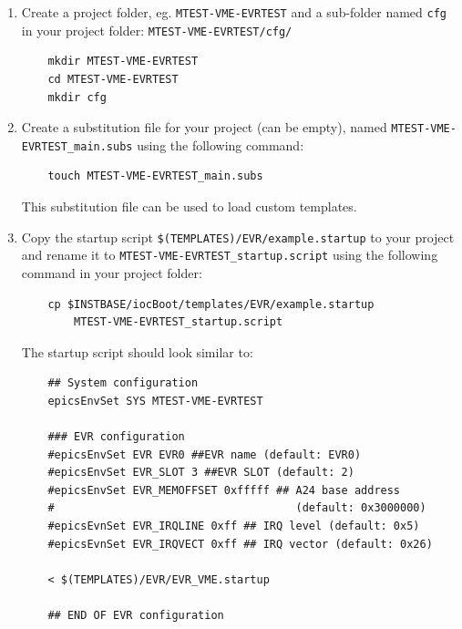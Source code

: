 \documentclass[12pt,a4paper]{article}
\begin{document}
\begin{enumerate}

	\item Create a project folder, eg. \texttt{MTEST-VME-EVRTEST} and a sub-folder named \texttt{cfg} in your project folder: \texttt{MTEST-VME-EVRTEST/cfg/}
\begin{verbatim}
	mkdir MTEST-VME-EVRTEST
	cd MTEST-VME-EVRTEST
	mkdir cfg
\end{verbatim}

	\item Create a substitution file for your project (can be empty), named \texttt{MTEST-VME-EVRTEST\_main.subs} using the following command: 
\begin{verbatim}
	touch MTEST-VME-EVRTEST_main.subs
\end{verbatim}	
	This substitution file can be used to load custom templates. %
	
	\item Copy the startup script \newline \texttt{\$(TEMPLATES)/EVR/example.startup} to your project and rename it to \texttt{MTEST-VME-EVRTEST\_startup.script} using the following command in your project folder:
\begin{verbatim}
	cp $INSTBASE/iocBoot/templates/EVR/example.startup 
	    MTEST-VME-EVRTEST_startup.script
\end{verbatim}

	The startup script should look similar to:
\begin{verbatim}
	## System configuration
	epicsEnvSet SYS MTEST-VME-EVRTEST
	
	### EVR configuration
	#epicsEnvSet EVR EVR0 ##EVR name (default: EVR0)
	#epicsEnvSet EVR_SLOT 3 ##EVR SLOT (default: 2)
	#epicsEnvSet EVR_MEMOFFSET 0xfffff ## A24 base address
	#                                     (default: 0x3000000)
	#epicsEvnSet EVR_IRQLINE 0xff ## IRQ level (default: 0x5)
	#epicsEvnSet EVR_IRQVECT 0xff ## IRQ vector (default: 0x26)
	
	< $(TEMPLATES)/EVR/EVR_VME.startup
	
	## END OF EVR configuration
\end{verbatim}


\end{enumerate}
\end{document}
